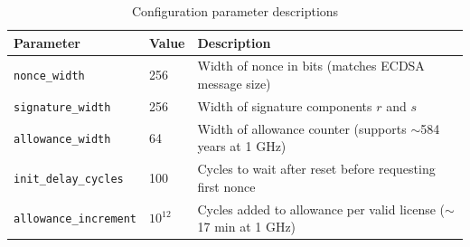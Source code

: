 \documentclass[11pt]{article}
\begin{document}
\begin{table}[h]
\centering
\begin{tabular}{@{}llp{6cm}@{}}
\toprule
\textbf{Parameter} & \textbf{Value} & \textbf{Description} \\
\midrule
\texttt{nonce\_width} & 256 & Width of nonce in bits (matches ECDSA message size) \\
\midrule
\texttt{signature\_width} & 256 & Width of signature components $r$ and $s$ \\
\midrule
\texttt{allowance\_width} & 64 & Width of allowance counter (supports $\sim$584 years at 1 GHz) \\
\midrule
\texttt{init\_delay\_cycles} & 100 & Cycles to wait after reset before requesting first nonce \\
\midrule
\texttt{allowance\_increment} & $10^{12}$ & Cycles added to allowance per valid license ($\sim$17 min at 1 GHz) \\
\bottomrule
\end{tabular}
\caption{Configuration parameter descriptions}
\end{table}
\end{document}
